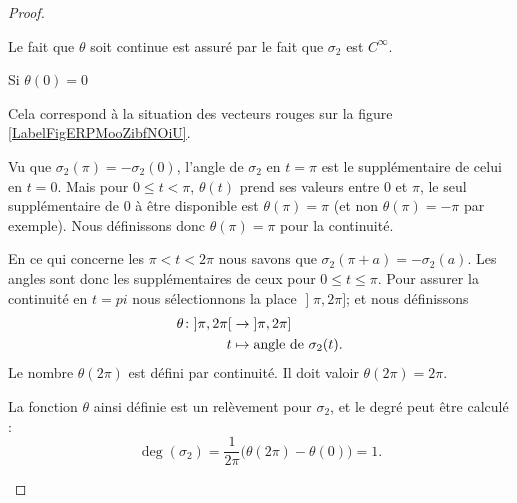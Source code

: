 \begin{proof}
\begin{subproof}
            Le fait que \( \theta\) soit continue est assuré par le fait que \( \sigma_2\) est \(  C^{\infty}\).

            \begin{subproof}
                \item[Si \( \theta(0)=0\)]

                    Cela correspond à la situation des vecteurs rouges sur la figure \ref{LabelFigERPMooZibfNOiU}.

                    Vu que \( \sigma_2(\pi)=-\sigma_2(0)\), l'angle de \( \sigma_2\) en \( t=\pi\) est le supplémentaire de celui en \( t=0\). Mais pour \( 0\leq t<\pi\), \( \theta(t)\) prend ses valeurs entre \( 0\) et \( \pi\), le seul supplémentaire de \( 0\) à être disponible est \( \theta(\pi)=\pi\) (et non \( \theta(\pi)=-\pi\) par exemple). Nous définissons donc \( \theta(\pi)=\pi\) pour la continuité.

                En ce qui concerne les \( \pi<t< 2\pi\) nous savons que \( \sigma_2(\pi+a)=-\sigma_2(a)\). Les angles sont donc les supplémentaires de ceux pour \( 0\leq t\leq \pi\). Pour assurer la continuité en \( t=pi\) nous sélectionnons la place \( \mathopen] \pi , 2\pi \mathclose]\); et nous définissons
                \begin{equation}
                    \begin{aligned}
                    \theta\colon \mathopen] \pi , 2\pi \mathclose[&\to \mathopen] \pi , 2\pi \mathclose] \\
                    t&\mapsto \text{angle de \( \sigma_2(t)\)}. 
                    \end{aligned}
                \end{equation}
                Le nombre \( \theta(2\pi)\) est défini par continuité. Il doit valoir \( \theta(2\pi)=2\pi\).

                La fonction \( \theta\) ainsi définie est un relèvement pour \( \sigma_2\), et le degré peut être calculé :
                \begin{equation}
                    \deg(\sigma_2)=\frac{1}{ 2\pi }\big( \theta(2\pi)-\theta(0) \big)=1.
                \end{equation}

\newcommand{\CaptionFigERPMooZibfNOiU}{Les vecteurs représenant \( \sigma_2\) dans le cas où \( \beta'(0)\) est dans le sens de \( \ell_p\) ou dans le sens inverse. Pour le sport nous avons dessiné la situation avec une droite \( \ell\) quelconque plutôt que horizontale.}

                

\end{subproof}
\end{subproof}
\end{proof}
